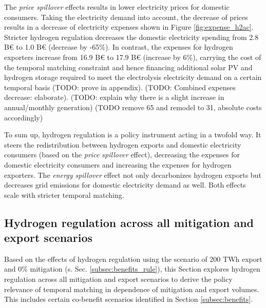 The \textit{price spillover} effects results in lower electricity prices for domestic consumers. Taking the electricity demand into account, the decrease of prices results in a decrease of electricity expenses shown in 
Figure \ref{fig:expense_h2ac}. Stricter hydrogen regulation decreases the domestic electricity spending from 2.8 B€ to 1.0 B€ (decrease by -65\%). In contrast, the expenses for hydrogen exporters increase from 16.9 B€ to 17.9 B€ (increase by 6\%), carrying the cost of the temporal matching constraint and hence financing additional solar PV and hydrogen storage required to meet the electrolysis electricity demand on a certain temporal basis (TODO: prove in appendix). (TODO: Combined expenses decrease: elaborate). (TODO: explain why there is a slight increase in annual/monthly generation) (TODO remove 65 and remodel to 31, absolute costs accordingly)


To sum up, hydrogen regulation is a policy instrument acting in a twofold way. It steers the redistribution between hydrogen exports and domestic electricity consumers (based on the \textit{price spillover} effect), decreasing the expenses for domestic electricity consumers and increasing the expenses for hydrogen exporters. The \textit{energy spillover} effect not only decarbonizes hydrogen exports but decreases grid emissions for  domestic electricity demand as well. Both effects scale with stricter temporal matching.





\subsection{Hydrogen regulation across all mitigation and export scenarios}
\label{subsec:rule_all}

Based on the effects of hydrogen regulation using the scenario of 200 TWh export and 0\% mitigation (s. Sec. \ref{subsec:benefits_rule}), this Section explores hydrogen regulation across all mitigation and export scenarios to derive the policy relevance of temporal matching in dependence of mitigation and export volumes. This includes certain co-benefit scenarios identified in Section \ref{subsec:benefits}.


